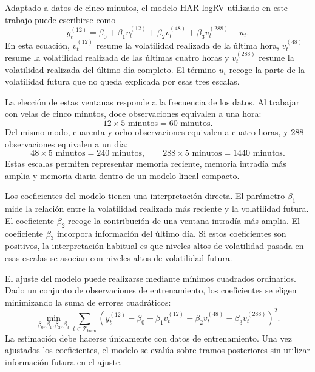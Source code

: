 Adaptado a datos de cinco minutos, el modelo HAR-logRV utilizado en este trabajo puede escribirse como
\begin{equation}
    y_t^{(12)}
    =
    \beta_0
    + \beta_1 v_t^{(12)}
    + \beta_2 v_t^{(48)}
    + \beta_3 v_t^{(288)}
    + u_t.
\end{equation}
En esta ecuación, \(v_t^{(12)}\) resume la volatilidad realizada de la última hora, \(v_t^{(48)}\) resume la volatilidad realizada de las últimas cuatro horas y \(v_t^{(288)}\) resume la volatilidad realizada del último día completo. El término \(u_t\) recoge la parte de la volatilidad futura que no queda explicada por esas tres escalas.

La elección de estas ventanas responde a la frecuencia de los datos. Al trabajar con velas de cinco minutos, doce observaciones equivalen a una hora:
\begin{equation}
    12 \times 5 \text{ minutos} = 60 \text{ minutos}.
\end{equation}
Del mismo modo, cuarenta y ocho observaciones equivalen a cuatro horas, y 288 observaciones equivalen a un día:
\begin{equation}
    48 \times 5 \text{ minutos} = 240 \text{ minutos},
    \qquad
    288 \times 5 \text{ minutos} = 1440 \text{ minutos}.
\end{equation}
Estas escalas permiten representar memoria reciente, memoria intradía más amplia y memoria diaria dentro de un modelo lineal compacto.

Los coeficientes del modelo tienen una interpretación directa. El parámetro \(\beta_1\) mide la relación entre la volatilidad realizada más reciente y la volatilidad futura. El coeficiente \(\beta_2\) recoge la contribución de una ventana intradía más amplia. El coeficiente \(\beta_3\) incorpora información del último día. Si estos coeficientes son positivos, la interpretación habitual es que niveles altos de volatilidad pasada en esas escalas se asocian con niveles altos de volatilidad futura.

El ajuste del modelo puede realizarse mediante mínimos cuadrados ordinarios. Dado un conjunto de observaciones de entrenamiento, los coeficientes se eligen minimizando la suma de errores cuadráticos:
\begin{equation}
    \min_{\beta_0,\beta_1,\beta_2,\beta_3}
    \sum_{t\in \mathcal{T}_{\mathrm{train}}}
    \left(
    y_t^{(12)}
    -
    \beta_0
    -
    \beta_1 v_t^{(12)}
    -
    \beta_2 v_t^{(48)}
    -
    \beta_3 v_t^{(288)}
    \right)^2.
\end{equation}
La estimación debe hacerse únicamente con datos de entrenamiento. Una vez ajustados los coeficientes, el modelo se evalúa sobre tramos posteriores sin utilizar información futura en el ajuste.

